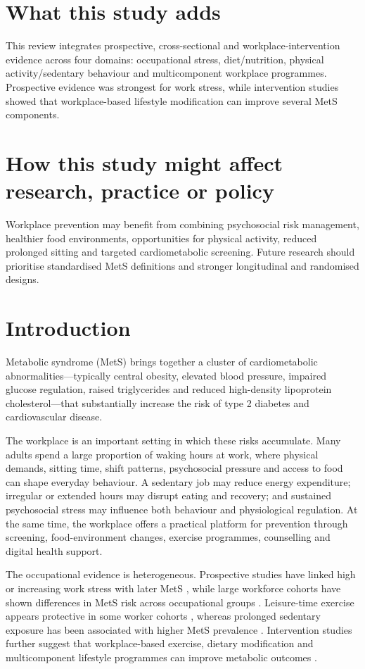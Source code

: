 \documentclass[11pt]{article}
\begin{document}
\section*{What this study adds}
This review integrates prospective, cross-sectional and workplace-intervention evidence across four domains: occupational stress, diet/nutrition, physical activity/sedentary behaviour and multicomponent workplace programmes. Prospective evidence was strongest for work stress, while intervention studies showed that workplace-based lifestyle modification can improve several MetS components.

\section*{How this study might affect research, practice or policy}
Workplace prevention may benefit from combining psychosocial risk management, healthier food environments, opportunities for physical activity, reduced prolonged sitting and targeted cardiometabolic screening. Future research should prioritise standardised MetS definitions and stronger longitudinal and randomised designs.

\section{Introduction}

Metabolic syndrome (MetS) brings together a cluster of cardiometabolic abnormalities---typically central obesity, elevated blood pressure, impaired glucose regulation, raised triglycerides and reduced high-density lipoprotein cholesterol---that substantially increase the risk of type 2 diabetes and cardiovascular disease.

The workplace is an important setting in which these risks accumulate. Many adults spend a large proportion of waking hours at work, where physical demands, sitting time, shift patterns, psychosocial pressure and access to food can shape everyday behaviour. A sedentary job may reduce energy expenditure; irregular or extended hours may disrupt eating and recovery; and sustained psychosocial stress may influence both behaviour and physiological regulation. At the same time, the workplace offers a practical platform for prevention through screening, food-environment changes, exercise programmes, counselling and digital health support.

The occupational evidence is heterogeneous. Prospective studies have linked high or increasing work stress with later MetS \citep{Garbarino2015,Yamaguchi2018}, while large workforce cohorts have shown differences in MetS risk across occupational groups \citep{vanZon2020Occupational,Runge2021Metabolic}. Leisure-time exercise appears protective in some worker cohorts \citep{Kuwahara2016}, whereas prolonged sedentary exposure has been associated with higher MetS prevalence \citep{Motuma2020}. Intervention studies further suggest that workplace-based exercise, dietary modification and multicomponent lifestyle programmes can improve metabolic outcomes \citep{Haufe2019,Ma2025,Bogale2025}.
\end{document}
